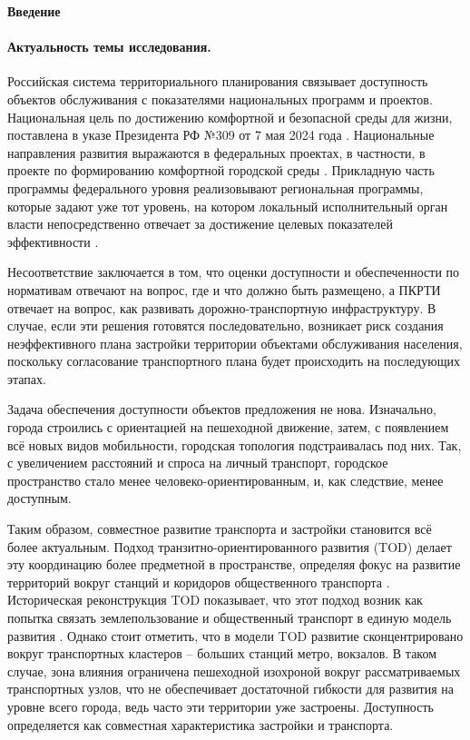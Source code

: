 \documentclass[14pt,a4paper]{extarticle}
\begin{document}
\begin{center}
\textbf{Введение}
\end{center}

\paragraph*{Актуальность темы исследования.}

Российская система территориального планирования связывает доступность объектов обслуживания с показателями национальных программ и проектов. Национальная цель по достижению комфортной и безопасной среды для жизни, поставлена в указе Президента РФ №309 от 7 мая 2024 года \cite{rfDecree309_2024}. Национальные направления развития выражаются в федеральных проектах, в частности, в проекте по формированию комфортной городской среды \cite{federalProjectFkgsPassport}. Прикладную часть программы федерального уровня реализовывают региональная программы, которые задают уже тот уровень, на котором локальный исполнительный орган власти непосредственно отвечает за достижение целевых показателей  эффективности \cite{spbRegionalFkgs}.

Несоответствие заключается в том, что оценки доступности и обеспеченности по нормативам отвечают на вопрос, где и что должно быть размещено, а ПКРТИ отвечает на вопрос, как развивать дорожно-транспортную инфраструктуру. В случае, если эти решения готовятся последовательно, возникает риск создания неэффективного плана застройки территории объектами обслуживания населения, поскольку согласование транспортного плана будет происходить на последующих этапах.

Задача обеспечения доступности объектов предложения не нова. Изначально, города строились с ориентацией на пешеходной движение, затем, с появлением всё новых видов мобильности, городская топология подстраивалась под них. Так, с увеличением расстояний и спроса на личный транспорт, городское пространство стало менее человеко-ориентированным, и, как следствие, менее доступным.

Таким образом, совместное развитие транспорта и застройки становится всё более актуальным. Подход транзитно-ориентированного развития (TOD) делает эту координацию более предметной в пространстве, определяя фокус на развитие территорий вокруг станций и коридоров общественного транспорта \cite{worldbankTod3v}. Историческая реконструкция TOD показывает, что этот подход возник как попытка связать землепользование и общественный транспорт в единую модель развития \cite{carlton2009tod}. Однако стоит отметить, что в модели TOD развитие сконцентрировано вокруг транспортных кластеров -- больших станций метро, вокзалов. В таком случае, зона влияния ограничена пешеходной изохроной вокруг рассматриваемых транспортных узлов, что не обеспечивает достаточной гибкости для развития на уровне всего города, ведь часто эти территории уже застроены. Доступность определяется как совместная характеристика застройки и транспорта.
\end{document}
